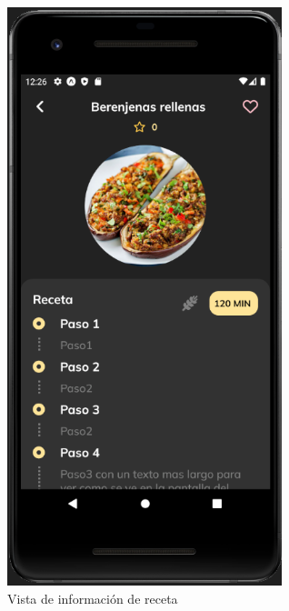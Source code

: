 \begin{figure}[!h]
  \centering
  \includegraphics[width=8cm, scale=1]{Images/Imagenes/inforeceta1.png}
  \caption{Vista de información de receta}
  \label{fig:inforeceta1}
\end{figure}

